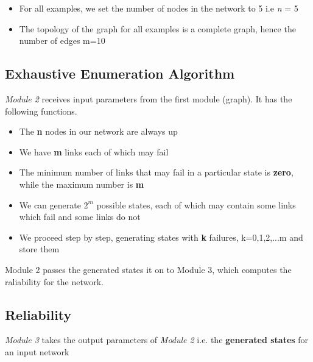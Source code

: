\documentclass[12pt,letterpaper,titlepage,en-US]{article}
\begin{document}
\begin{itemize}
\item For all examples, we set the number of nodes in the network to 5 i.e \textit{n} = 5

\item The topology of the graph for all examples is a complete graph, hence the number of edges m=10



\end{itemize}




\subsection{Exhaustive Enumeration Algorithm}
\textit{Module 2} receives input parameters from the first module (graph). It has the following functions.


\begin{itemize}
\item The \textbf{n} nodes in our network are always up
\item We have \textbf{m} links each of which may fail
\item The minimum number of links that may fail in a particular state is \textbf{zero}, while the maximum number is \textbf{m}
\item We can generate \textbf{$2^{m}$} possible states, each of which may contain some links which fail and some links do not
\item We proceed step by step, generating states with \textbf{k} failures, k=0,1,2,...m and store them

\end{itemize}

Module 2  passes the generated states it on to Module 3, which computes the raliability for the network.



\subsection{Reliability}

\textit{Module 3} takes the output parameters of \textit{Module 2} i.e. the \textbf{generated states} for an input network
\end{document}
